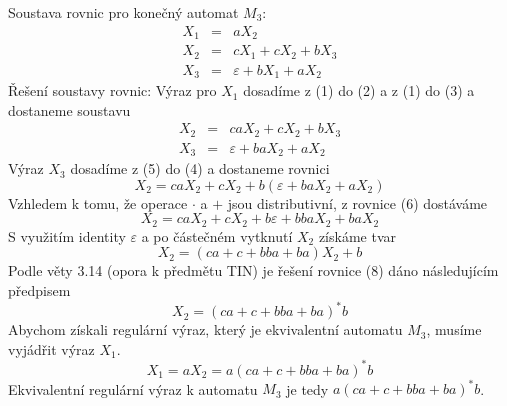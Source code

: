 \documentclass[a4paper,12pt]{article}
\begin{document}
\begin{enumerate}[label=\textbf{\arabic*}.]
\begin{center}
   \end{center}
   Soustava rovnic pro konečný automat $M_3$:
   \begin{eqnarray}
      X_1 &=& aX_2 \\
      X_2 &=& cX_1 + cX_2 + bX_3\\
      X_3 &=& \varepsilon + bX_1 + aX_2
   \end{eqnarray}
   Řešení soustavy rovnic:
   Výraz pro $X_1$ dosadíme z (1) do (2) a z (1) do (3) a dostaneme soustavu
   \begin{eqnarray}
    X_2 &=& caX_2 + cX_2 + bX_3 \\
    X_3 &=& \varepsilon + baX_2 + aX_2
   \end{eqnarray}
   Výraz $X_3$ dosadíme z (5) do (4) a dostaneme rovnici
   \begin{equation}
     X_2 = caX_2 + cX_2 + b(\varepsilon + baX_2 + aX_2)
   \end{equation}
   Vzhledem k tomu, že operace $\cdot$ a $+$ jsou distributivní, z rovnice (6) dostáváme
   \begin{equation}
     X_2 = caX_2 + cX_2 + b\varepsilon + bbaX_2 + baX_2
   \end{equation}
   S využitím identity $\varepsilon$ a po částečném vytknutí $X_2$ získáme tvar
   \begin{equation}
     X_2 = (ca + c + bba + ba)X_2 + b
   \end{equation}
   Podle věty 3.14 (opora k předmětu TIN) je řešení rovnice (8) dáno následujícím předpisem
   \begin{equation}
     X_2 = (ca + c + bba + ba)^*b
   \end{equation}
   Abychom získali regulární výraz, který je ekvivalentní automatu $M_3$, musíme vyjádřit výraz $X_1$.
   \begin{equation}
     X_1 = aX_2 = a(ca + c + bba + ba)^*b
   \end{equation}
   Ekvivalentní regulární výraz k automatu $M_3$ je tedy $a(ca + c + bba + ba)^*b$.
   

\end{enumerate}
\end{document}
